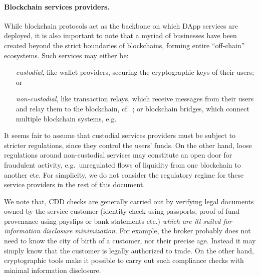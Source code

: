 \documentclass[runningheads,10pt]{llncs}
\numberwithin{equation}{section}
\begin{document}
\paragraph{Blockchain services providers.} While blockchain protocols act as
the backbone on which DApp services are deployed, it is also important to note
that a myriad of businesses have been created beyond the strict boundaries of
blockchains, forming entire ``off-chain'' ecosystems. Such services may
either be:
\begin{itemize}
\item[\emph{custodial},] like wallet providers, securing the cryptographic
  keys of their users; or
\item[\emph{non-custodial},] like transaction relays, which receive messages
  from their users and relay them to the blockchain, cf.~\cite{zeth-relay}; or
  blockchain bridges, which connect multiple blockchain systems,
  e.g.~\cite{btcrelay,rainbow-bridge}
\end{itemize}

It seems fair to assume that custodial services providers must be subject to
stricter regulations, since they control the users' funds. On the other hand,
loose regulations around non-custodial services may constitute an open door for
fraudulent activity, e.g.~unregulated flows of liquidity from one blockchain to
another etc. For simplicity, we do not consider the regulatory regime for these
service providers in the rest of this document.

\begin{remark}
  We note that, CDD checks are generally carried out by verifying legal
  documents owned by the service customer (identity check using passports, proof
  of fund provenance using payslips or bank statements etc.) \emph{which are
    ill-suited for information disclosure minimization}. For example, the broker
  probably does not need to know the city of birth of a customer, nor their
  precise age. Instead it may simply know that the customer is legally
  authorized to trade. On the other hand, cryptographic tools make it possible
  to carry out such compliance checks with minimal information
  disclosure.
\end{remark}
\end{document}
